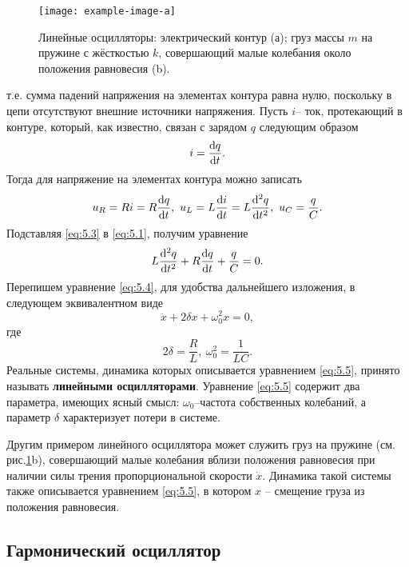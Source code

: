 \begin{figure}[h!]
        \centering
        \texttt{[image: example-image-a]}
        \caption{Линейные осцилляторы: электрический контур (а); груз массы $m$ на пружине с жёсткостью $k$, совершающий малые колебания около положения равновесия (b).}
        \label{fig:5.1}
\end{figure}
т.е. сумма падений напряжения на элементах контура равна нулю, поскольку в цепи отсутствуют внешние источники напряжения. Пусть $i$-- ток, протекающий в контуре, который, как известно, связан с зарядом $q$ следующим образом
\begin{equation}
        \label{eq:5.2}
        i = \dv{q}{t}.
\end{equation}
Тогда для напряжение на элементах контура можно записать
\begin{equation}
        \label{eq:5.3}
        u_R = Ri = R \dv{q}{t}, ~ u_L = L \dv{i}{t} = L \dv[2]{q}{t},~ u_C= \frac{q}{C}.
\end{equation}
Подставляя \eqref{eq:5.3} в \eqref{eq:5.1}, получим уравнение
\begin{equation}
        \label{eq:5.4}
        L\dv[2]{q}{t} + R \dv{q}{t} + \frac{q}{C} = 0.
\end{equation}
Перепишем уравнение \eqref{eq:5.4}, для удобства дальнейшего изложения, в следующем эквивалентном виде
\begin{equation}
        \label{eq:5.5}
        \ddot x + 2 \delta x + \omega_0^2 x =0,
\end{equation}
где 
\begin{equation}
        \label{eq:}
        2 \delta = \frac{R}{L}, ~ \omega_0^2=\frac{1}{LC}.
\end{equation}
Реальные системы, динамика которых описывается уравнением \eqref{eq:5.5}, принято называть
\textbf{линейными осцилляторами}. Уравнение \eqref{eq:5.5} содержит два параметра, имеющих ясный смысл: $\omega_0$--частота собственных колебаний, а параметр $\delta$ характеризует потери в системе.

Другим примером линейного осциллятора может служить груз на пружине (см. рис.\ref{fig:5.1}b), совершающий малые колебания вблизи положения равновесия при наличии силы трения пропорциональной скорости $\dot x$. Динамика такой системы также описывается уравнением \eqref{eq:5.5}, в котором $x$ -- смещение груза из положения равновесия.

\subsection{Гармонический осциллятор}%
\label{sub:5.1.1}


